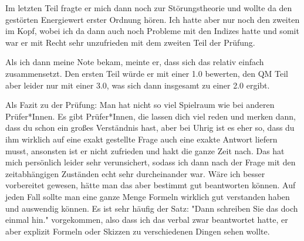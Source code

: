 \noindent Im letzten Teil fragte er mich dann noch zur Störungstheorie und wollte da den gestörten Energiewert erster Ordnung hören. Ich hatte aber nur noch den zweiten im Kopf, wobei ich da dann auch noch Probleme mit den Indizes hatte und somit war er mit Recht sehr unzufrieden mit dem zweiten Teil der Prüfung.

\noindent Als ich dann meine Note bekam, meinte er, dass sich das relativ einfach zusammensetzt. Den ersten Teil würde er mit einer 1.0 bewerten, den QM Teil aber leider nur mit einer 3.0, was sich dann insgesamt zu einer 2.0 ergibt. 

\noindent Als Fazit zu der Prüfung: Man hat nicht so viel Spielraum wie bei anderen Prüfer*Innen. Es gibt Prüfer*Innen, die lassen dich viel reden und merken dann, dass du schon ein großes Verständnis hast, aber bei Uhrig ist es eher so, dass du ihm wirklich auf eine exakt gestellte Frage auch eine exakte Antwort liefern musst, ansonsten ist er nicht zufrieden und hakt die ganze Zeit nach. Das hat mich persönlich leider sehr verunsichert, sodass ich dann nach der Frage mit den zeitabhängigen Zuständen echt sehr durcheinander war. Wäre ich besser vorbereitet gewesen, hätte man das aber bestimmt gut beantworten können.
Auf jeden Fall sollte man eine ganze Menge Formeln wirklich gut verstanden haben und auswendig können. Es ist sehr häufig der Satz: "Dann schreiben Sie das doch einmal hin." vorgekommen, also dass ich das verbal zwar beantwortet hatte, er aber explizit Formeln oder Skizzen zu verschiedenen Dingen sehen wollte. 
 
